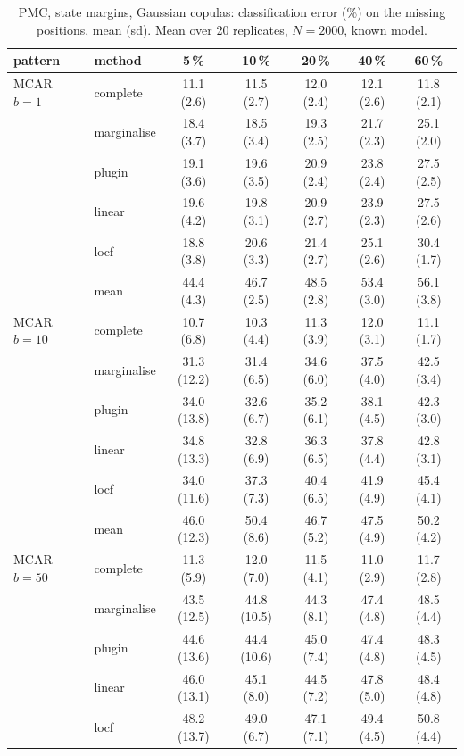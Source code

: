 \begin{table}[htbp]
  \centering
  \small
  \setlength{\tabcolsep}{4pt}
  \caption{PMC, state margins, Gaussian copulas: classification error (\%) on the missing positions, mean (sd). Mean over 20 replicates, $N = 2000$, known model.}
  \label{tab:missing-err-pmc_gauss_k2}
  \begin{tabular}{llccccc}
    \toprule
    pattern & method & 5\,\% & 10\,\% & 20\,\% & 40\,\% & 60\,\% \\
    \midrule
    MCAR $b{=}1$ & complete & 11.1 (2.6) & 11.5 (2.7) & 12.0 (2.4) & 12.1 (2.6) & 11.8 (2.1) \\
     & marginalise & 18.4 (3.7) & 18.5 (3.4) & 19.3 (2.5) & 21.7 (2.3) & 25.1 (2.0) \\
     & plugin & 19.1 (3.6) & 19.6 (3.5) & 20.9 (2.4) & 23.8 (2.4) & 27.5 (2.5) \\
     & linear & 19.6 (4.2) & 19.8 (3.1) & 20.9 (2.7) & 23.9 (2.3) & 27.5 (2.6) \\
     & locf & 18.8 (3.8) & 20.6 (3.3) & 21.4 (2.7) & 25.1 (2.6) & 30.4 (1.7) \\
     & mean & 44.4 (4.3) & 46.7 (2.5) & 48.5 (2.8) & 53.4 (3.0) & 56.1 (3.8) \\
    \addlinespace
    MCAR $b{=}10$ & complete & 10.7 (6.8) & 10.3 (4.4) & 11.3 (3.9) & 12.0 (3.1) & 11.1 (1.7) \\
     & marginalise & 31.3 (12.2) & 31.4 (6.5) & 34.6 (6.0) & 37.5 (4.0) & 42.5 (3.4) \\
     & plugin & 34.0 (13.8) & 32.6 (6.7) & 35.2 (6.1) & 38.1 (4.5) & 42.3 (3.0) \\
     & linear & 34.8 (13.3) & 32.8 (6.9) & 36.3 (6.5) & 37.8 (4.4) & 42.8 (3.1) \\
     & locf & 34.0 (11.6) & 37.3 (7.3) & 40.4 (6.5) & 41.9 (4.9) & 45.4 (4.1) \\
     & mean & 46.0 (12.3) & 50.4 (8.6) & 46.7 (5.2) & 47.5 (4.9) & 50.2 (4.2) \\
    \addlinespace
    MCAR $b{=}50$ & complete & 11.3 (5.9) & 12.0 (7.0) & 11.5 (4.1) & 11.0 (2.9) & 11.7 (2.8) \\
     & marginalise & 43.5 (12.5) & 44.8 (10.5) & 44.3 (8.1) & 47.4 (4.8) & 48.5 (4.4) \\
     & plugin & 44.6 (13.6) & 44.4 (10.6) & 45.0 (7.4) & 47.4 (4.8) & 48.3 (4.5) \\
     & linear & 46.0 (13.1) & 45.1 (8.0) & 44.5 (7.2) & 47.8 (5.0) & 48.4 (4.8) \\
     & locf & 48.2 (13.7) & 49.0 (6.7) & 47.1 (7.1) & 49.4 (4.5) & 50.8 (4.4) \\

\end{tabular}
\end{table}
